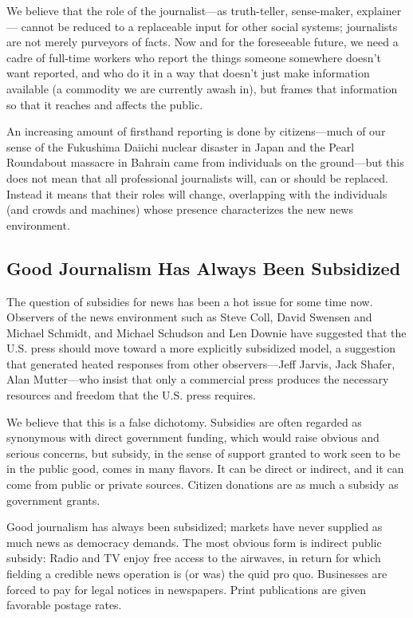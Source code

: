 We believe that the role of the journalist—as truth-teller, sense-maker, explainer—
cannot be reduced to a replaceable input for other social systems; journalists are
not merely purveyors of facts. Now and for the foreseeable future, we need a
cadre of full-time workers who report the things someone somewhere doesn’t
want reported, and who do it in a way that doesn’t just make information available
(a commodity we are currently awash in), but frames that information so
that it reaches and affects the public.

An increasing amount of firsthand reporting is done by citizens—much of our
sense of the Fukushima Daiichi nuclear disaster in Japan and the Pearl Roundabout
massacre in Bahrain came from individuals on the ground—but this does
not mean that all professional journalists will, can or should be replaced. Instead it
means that their roles will change, overlapping with the individuals (and crowds
and machines) whose presence characterizes the new news environment.

\subsection{Good Journalism Has Always Been Subsidized}
The question of subsidies for news has been a hot issue for some time now.
Observers of the news environment such as Steve Coll, David Swensen and
Michael Schmidt, and Michael Schudson and Len Downie have suggested that
the U.S. press should move toward a more explicitly subsidized model, a suggestion
that generated heated responses from other observers—Jeff Jarvis, Jack Shafer,
Alan Mutter—who insist that only a commercial press produces the necessary
resources and freedom that the U.S. press requires.

We believe that this is a false dichotomy. Subsidies are often regarded as synonymous
with direct government funding, which would raise obvious and serious
concerns, but subsidy, in the sense of support granted to work seen to be in the public good, comes in many flavors. It can be direct or indirect, and it can
come from public or private sources. Citizen donations are as much a subsidy
as government grants.

Good journalism has always been subsidized; markets have never supplied as
much news as democracy demands. The most obvious form is indirect public
subsidy: Radio and TV enjoy free access to the airwaves, in return for which
fielding a credible news operation is (or was) the quid pro quo. Businesses
are forced to pay for legal notices in newspapers. Print publications are given
favorable postage rates.

